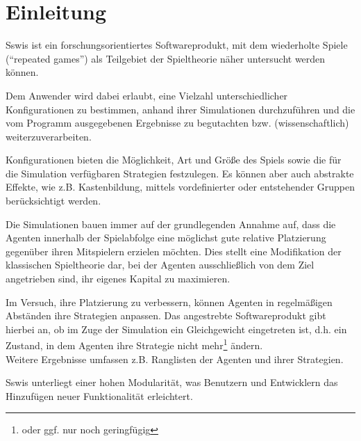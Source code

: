 \section{Einleitung}

Sswis ist ein forschungsorientiertes Softwareprodukt, mit dem wiederholte Spiele ("`repeated games"') als Teilgebiet der Spieltheorie näher untersucht werden können.

Dem Anwender wird dabei erlaubt, eine Vielzahl unterschiedlicher Konfigurationen zu bestimmen, anhand ihrer Simulationen durchzuführen und die vom Programm ausgegebenen Ergebnisse zu begutachten bzw. (wissenschaftlich) weiterzuverarbeiten.

Konfigurationen bieten die Möglichkeit, Art und Größe des Spiels sowie die für die Simulation verfügbaren Strategien festzulegen. Es können aber auch abstrakte Effekte, wie z.B. Kastenbildung, mittels vordefinierter oder entstehender Gruppen berücksichtigt werden.

Die Simulationen bauen immer auf der grundlegenden Annahme auf, dass die Agenten innerhalb der Spielabfolge eine möglichst gute relative Platzierung gegenüber ihren Mitspielern erzielen möchten.
Dies stellt eine Modifikation der klassischen Spieltheorie dar, bei der Agenten ausschließlich von dem Ziel angetrieben sind, ihr eigenes Kapital zu maximieren.

Im Versuch, ihre Platzierung zu verbessern, können Agenten in regelmäßigen Abständen ihre Strategien anpassen.
Das angestrebte Softwareprodukt gibt hierbei an, ob im Zuge der Simulation ein Gleichgewicht eingetreten ist, d.h. ein Zustand, in dem Agenten ihre Strategie nicht mehr\footnote{oder ggf. nur noch geringfügig} ändern.\\
Weitere Ergebnisse umfassen z.B. Ranglisten der Agenten und ihrer Strategien.

Sswis unterliegt einer hohen Modularität, was Benutzern und Entwicklern das Hinzufügen neuer Funktionalität erleichtert.
